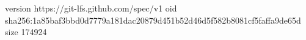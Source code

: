 version https://git-lfs.github.com/spec/v1
oid sha256:1a85baf3bbd0d7779a181dac20879d451b52d46d5f582b8081cf5faffa9de65d
size 174924
